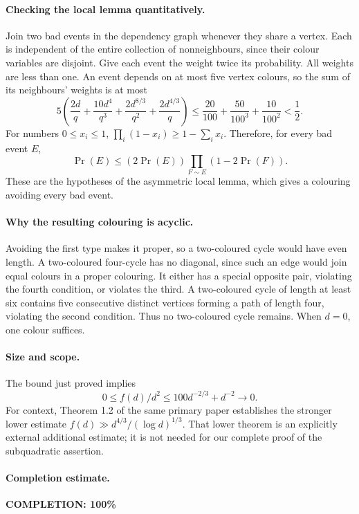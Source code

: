 \paragraph{Checking the local lemma quantitatively.}
Join two bad events in the dependency graph whenever they
share a vertex. Each is independent of the entire collection
of nonneighbours, since their colour variables are disjoint.
Give each event the weight twice its probability.
All weights are less than one.
An event depends on at most five vertex colours, so the
sum of its neighbours' weights is at most
\[
 5\left(\frac{2d}{q}
       +\frac{10d^4}{q^3}
       +\frac{2d^{8/3}}{q^2}
       +\frac{2d^{4/3}}q\right)
 \leq \frac{20}{100}+\frac{50}{100^3}+\frac{10}{100^2}
 <\frac12.
\]
For numbers \(0\leq x_i\leq1\),
\(\prod_i(1-x_i)\geq1-\sum_i x_i\).
Therefore, for every bad event \(E\),
\[
 \Pr(E)\leq (2\Pr(E))
              \prod_{F\sim E}(1-2\Pr(F)).
\]
These are the hypotheses of the asymmetric local lemma,
which gives a colouring avoiding every bad event.

\paragraph{Why the resulting colouring is acyclic.}
Avoiding the first type makes it proper, so a two-coloured
cycle would have even length.
A two-coloured four-cycle has no diagonal, since such an
edge would join equal colours in a proper colouring.
It either has a special opposite pair, violating the fourth
condition, or violates the third.
A two-coloured cycle of length at least six contains
five consecutive distinct vertices forming a path of
length four, violating the second condition.
Thus no two-coloured cycle remains.
When \(d=0\), one colour suffices.

\paragraph{Size and scope.}
The bound just proved implies
\[
 0\leq f(d)/d^2\leq100d^{-2/3}+d^{-2}\longrightarrow0.
\]
For context, Theorem 1.2 of the same primary paper
establishes the stronger lower estimate
\(f(d)\gg d^{4/3}/(\log d)^{1/3}\).
That lower theorem is an explicitly external additional
estimate; it is not needed for our complete proof of
the subquadratic assertion.

\paragraph{Completion estimate.}
\textbf{COMPLETION: 100\%}

